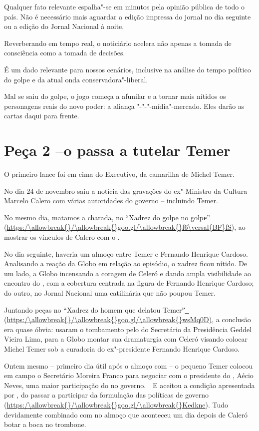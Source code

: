 Qualquer fato relevante espalha"-se em minutos pela opinião pública de
todo o país. Não é necessário mais aguardar a edição impressa do jornal
no dia seguinte ou a edição do Jornal Nacional à noite.

Reverberando em tempo real, o noticiário acelera não apenas a tomada de
consciência como a tomada de decisões.

É um dado relevante para nossos cenários, inclusive na análise do tempo
político do golpe e da atual onda conservadora"-liberal.

Mal se saiu do golpe, o jogo começa a afunilar e a tornar mais nítidos
os personagens reais do novo poder: a aliança
"-"-"-mídia"-mercado. Eles darão as cartas daqui para frente.

\section{Peça 2 --o  passa a tutelar Temer}

O primeiro lance foi em cima do Executivo, da camarilha de Michel Temer.

No dia 24 de novembro saiu a notícia das gravações do ex"-Ministro da
Cultura Marcelo Calero com várias autoridades do governo -- incluindo
Temer.

No mesmo dia, matamos a charada, no ``Xadrez do golpe no golpe͟''
(\url{https:/\allowbreak{}/\allowbreak{}goo.gl/\allowbreak{}f6\versal{BF}fS}), ao mostrar os vínculos de Calero com o
.

No dia seguinte, haveria um almoço entre Temer e Fernando Henrique
Cardoso. Analisando a reação da Globo em relação ao episódio, o xadrez
ficou nítido. De um lado, a Globo incensando a coragem de Celeró e dando
ampla visibilidade ao encontro do , com a cobertura centrada na
figura de Fernando Henrique Cardoso; do outro, no Jornal Nacional uma
catilinária que não poupou Temer.

Juntando peças no ``Xadrez do homem que delatou Temer''͟
(\url{https:/\allowbreak{}/\allowbreak{}goo.gl/\allowbreak{}wsMq0D)}, a conclusão era quase óbvia: usaram o
tombamento pelo  do Secretário da Presidência Geddel Vieira Lima,
para a Globo montar sua dramaturgia com Celeró visando colocar Michel
Temer sob a curadoria do ex"-presidente Fernando Henrique Cardoso.

Ontem mesmo -- primeiro dia útil após o almoço com  -- o pequeno
Temer colocou em campo o Secretário Moreira Franco para negociar com o
presidente do , Aécio Neves, uma maior participação do  no
governo.~~E aceitou a condição apresentada por , do  passar a
participar da formulação das políticas de governo
(\url{https:/\allowbreak{}/\allowbreak{}goo.gl/\allowbreak{}Kedkne}). Tudo devidamente combinado com  no
almoço que aconteceu um dia depois de Caleró botar a boca no trombone.

